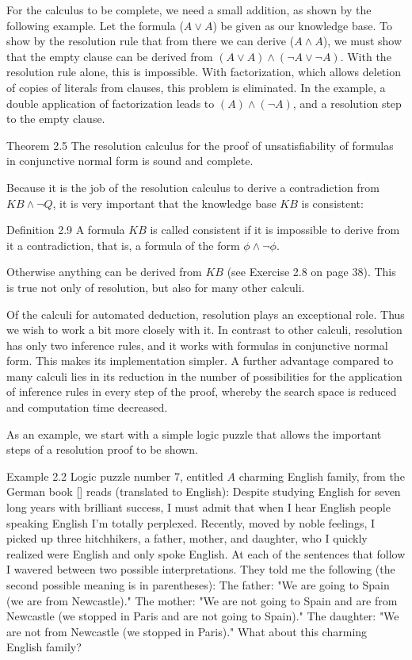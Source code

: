 \documentclass[10pt]{book}
\begin{document}
For the calculus to be complete, we need a small addition, as shown by the following example. Let the formula ($A \vee A$) be given as our knowledge base. To show by the resolution rule that from there we can derive ($A \wedge A$), we must show that the empty clause can be derived from $(A \vee A) \wedge (\neg A \vee \neg A)$. With the resolution rule alone, this is impossible. With factorization, which allows deletion of copies of literals from clauses, this problem is eliminated. In the example, a double application of factorization leads to $(A) \wedge (\neg A)$, and a resolution step to the empty clause.

\begin{displayquote}
Theorem 2.5 The resolution calculus for the proof of unsatisfiability of formulas in conjunctive normal form is sound and complete.
\end{displayquote}

Because it is the job of the resolution calculus to derive a contradiction from $K B \wedge \neg Q$, it is very important that the knowledge base $K B$ is consistent:

Definition 2.9 A formula $K B$ is called consistent if it is impossible to derive from it a contradiction, that is, a formula of the form $\phi \wedge \neg \phi$.

Otherwise anything can be derived from $K B$ (see Exercise 2.8 on page 38). This is true not only of resolution, but also for many other calculi.

Of the calculi for automated deduction, resolution plays an exceptional role. Thus we wish to work a bit more closely with it. In contrast to other calculi, resolution has only two inference rules, and it works with formulas in conjunctive normal form. This makes its implementation simpler. A further advantage compared to many calculi lies in its reduction in the number of possibilities for the application of inference rules in every step of the proof, whereby the search space is reduced and computation time decreased.

As an example, we start with a simple logic puzzle that allows the important steps of a resolution proof to be shown.

Example 2.2 Logic puzzle number 7, entitled $A$ charming English family, from the German book [\cite{ber89}] reads (translated to English):
Despite studying English for seven long years with brilliant success, I must admit that when I hear English people speaking English I'm totally perplexed. Recently, moved by noble feelings, I picked up three hitchhikers, a father, mother, and daughter, who I quickly realized were English and only spoke English. At each of the sentences that follow I wavered between two possible interpretations. They told me the following (the second possible meaning is in parentheses): The father: "We are going to Spain (we are from Newcastle)." The mother: "We are not going to Spain and are from Newcastle (we stopped in Paris and are not going to Spain)." The daughter: "We are not from Newcastle (we stopped in Paris)." What about this charming English family?
\end{document}
